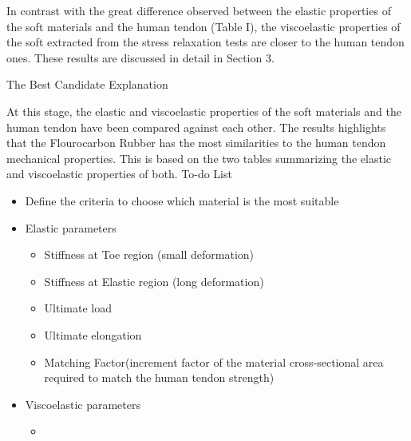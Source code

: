 In contrast with the great difference observed between the elastic properties of the soft materials and the human tendon (Table I), the viscoelastic properties of the soft  extracted from the stress relaxation tests are closer to the human tendon ones. These results are discussed in detail in Section 3.


{\huge The Best Candidate Explanation}

At this stage, the elastic and viscoelastic properties of the soft materials and the human tendon have been compared against each other. The results highlights that the Flourocarbon Rubber  has the most similarities to the human tendon mechanical properties. This is based on the two tables summarizing the elastic and viscoelastic properties of both.
To-do List
\begin{itemize}
    \item Define the criteria to choose which material is the most suitable
    \item Elastic parameters
    \begin{itemize}
        \item Stiffness at Toe region (small deformation)
        \item Stiffness at Elastic region (long deformation)
        \item Ultimate load
        \item Ultimate elongation
        \item Matching Factor(increment factor of the material cross-sectional area required to match the human tendon strength)
        
    \end{itemize}
    \item Viscoelastic parameters
    \begin{itemize}
        \item 
    \end{itemize}
\end{itemize}
